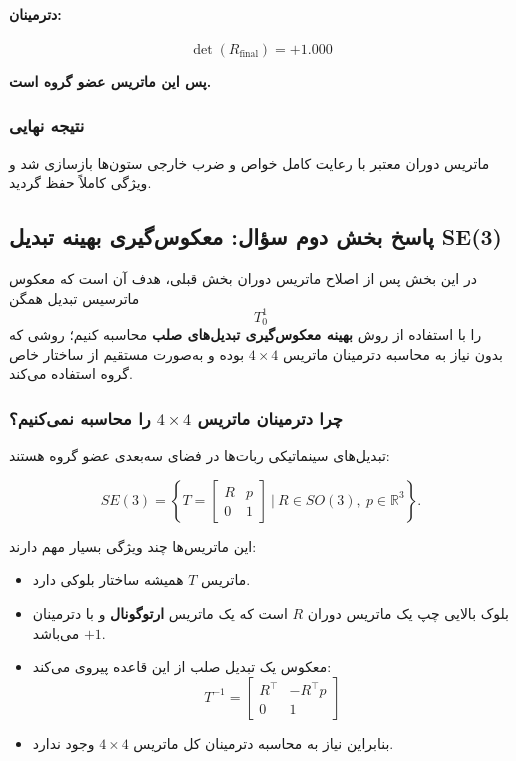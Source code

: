 \documentclass{article}
\begin{document}
\paragraph{دترمینان:}  
\[
\det(R_{\text{final}}) = +1.000
\]

\textbf{پس این ماتریس عضو گروه  است.}

\subsubsection{نتیجه نهایی}

ماتریس دوران معتبر با رعایت کامل خواص  و ضرب خارجی ستون‌ها بازسازی شد و ویژگی  کاملاً حفظ گردید.




\subsection{پاسخ بخش دوم سؤال: معکوس‌گیری بهینه تبدیل SE(3)}

در این بخش پس از اصلاح ماتریس دوران بخش قبلی، هدف آن است که معکوس ماترسیس تبدیل همگن
\[
T_{0}^{1}
\]
را با استفاده از روش \textbf{بهینه معکوس‌گیری تبدیل‌های صلب} محاسبه کنیم؛ روشی که بدون نیاز به محاسبه دترمینان ماتریس $4\times 4$ بوده و به‌صورت مستقیم از ساختار خاص گروه  استفاده می‌کند.

\subsubsection{چرا دترمینان ماتریس $4\times 4$ را محاسبه نمی‌کنیم؟}

تبدیل‌های سینماتیکی ربات‌ها در فضای سه‌بعدی عضو گروه  هستند:

\[
SE(3) =
\left\{
T=
\begin{bmatrix}
	R & p \\
	0 & 1
\end{bmatrix}
\ \bigg|\ 
R\in SO(3),\ p\in\mathbb{R}^3
\right\}.
\]

این ماتریس‌ها چند ویژگی بسیار مهم دارند:

\begin{itemize}
	\item ماتریس $T$ همیشه ساختار بلوکی دارد.
	\item بلوک بالایی چپ یک ماتریس دوران $R$ است که یک ماتریس \textbf{ارتوگونال} و با دترمینان $+1$ می‌باشد.
	\item معکوس یک تبدیل صلب از این قاعده پیروی می‌کند:
	\[
	T^{-1}=
	\begin{bmatrix}
		R^\top & -R^\top p \\
		0 & 1
	\end{bmatrix}
	\]
	\item بنابراین نیاز به محاسبه دترمینان کل ماتریس $4\times 4$ وجود ندارد.
\end{itemize}
\end{document}
